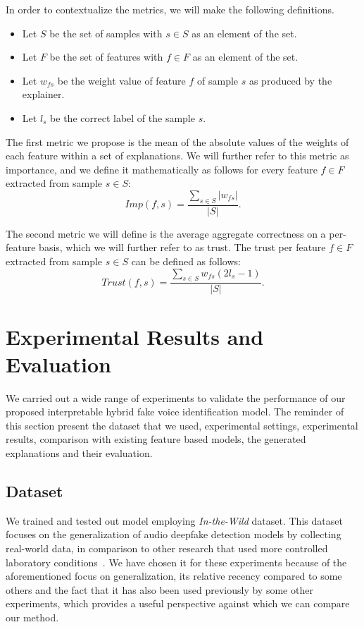 \documentclass{article}
\begin{document}
In order to contextualize the metrics, we will make the following definitions.
    \begin{itemize}
        \item Let \(S\) be the set of samples with \(s \in S\) as an element of the set.
        \item Let \(F\) be the set of features with \(f \in F\) as an element of the set.
        \item Let \(w_{fs}\) be the weight value of feature \(f\) of sample \(s\) as
            produced by the explainer.
        \item Let \(l_{s}\) be the correct label of the sample \(s\).
    \end{itemize}
The first metric we propose is the mean of the absolute values of the weights of each feature within a set of explanations.
We will further refer to this metric as importance, and we define it mathematically as follows for every feature \(f \in F\) extracted from sample \(s \in S\):
\begin{equation}
    Imp(f, s) = \frac{\sum_{s \in S} |w_{fs}|}{|S|}.
\end{equation}
			
The second metric we will define is the average aggregate correctness on a per-feature basis, which we will further refer to as trust. The trust per feature \(f \in F\) extracted from sample \(s \in S \) can be defined as follows:
\begin{equation}
    Trust(f, s) = \frac{\sum_{s \in S} w_{fs}(2l_{s}-1)}{|S|}.
\end{equation}
			
            
\section{Experimental Results and Evaluation} \label{sec:experimental_results}
We carried out a wide range of experiments to validate the performance of our proposed interpretable hybrid fake voice identification model. The reminder of this section present the dataset that we used, experimental settings, experimental results, comparison with existing feature based models, the generated explanations and their evaluation.

\subsection{Dataset}
We trained and tested out model employing \textit{In-the-Wild} dataset. This dataset focuses on the generalization of audio deepfake detection models by collecting real-world data, in comparison to other research that used more controlled laboratory conditions~\cite{muller_does_2022}. We have chosen it for these experiments because of the aforementioned focus on generalization, its relative recency compared to some others and the fact that it has also been used previously by some other experiments, which provides a useful perspective against which we can compare our method.
\end{document}
